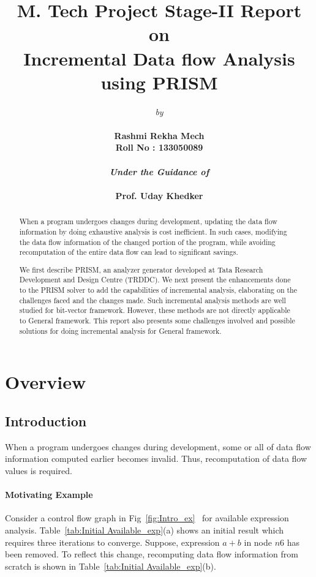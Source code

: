 \documentclass[11pt,a4paper,openright]{report}
\title{\textbf{M. Tech Project Stage-II Report}\\ on \\\textbf{Incremental Data flow Analysis using PRISM}}
\author{\emph{by}\\ \\ \bf{Rashmi Rekha Mech}\\\bf{Roll No : 133050089} \\
\\ \emph{Under the Guidance of}\\ \\\textbf{Prof. Uday Khedker}\\}
\date{}
\begin{document}
\maketitle
\begin{abstract}

When a program undergoes changes during development, updating the
data flow information by doing exhaustive analysis is cost inefficient. In such cases,
modifying the data flow information of the changed portion of the program, while avoiding recomputation of the entire 
data flow can lead to significant savings.

We first describe PRISM, an analyzer generator developed at Tata Research Development and Design Centre (TRDDC).
We next present the enhancements done to the PRISM solver to add the capabilities of incremental analysis, elaborating on the challenges faced and the changes made. 
Such incremental analysis methods are well studied for bit-vector framework. 
However, these methods are not directly applicable to General framework. 
This report also presents some challenges involved and possible solutions for doing incremental analysis for General framework.

\end{abstract}

\tableofcontents

\listoftables

\listoffigures

\cleardoublepage
\setcounter{page}{1}
\chapter{Overview}
\section{Introduction}
When a program undergoes changes during development, some or all of data flow information computed earlier becomes invalid.
Thus, recomputation of data flow values is required.
\subsubsection{Motivating Example}

Consider a control flow graph in Fig~\ref{fig:Intro_ex}~\cite{thesis_r} for available expression analysis. Table~\ref{tab:Initial Available_exp}(a) shows 
an initial result which requires three iterations to converge. Suppose, expression $a+b$ in node $n6$ has been removed. To reflect this change, recomputing
data flow information from scratch is shown in Table~\ref{tab:Initial Available_exp}(b). 
\end{document}
